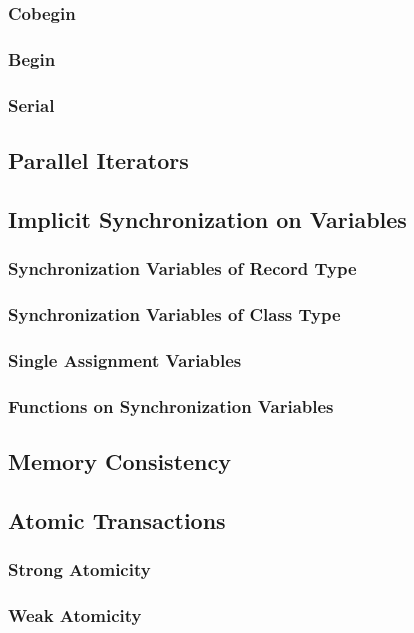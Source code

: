 \documentclass[10pt,twoside,titlepage]{article}
\begin{document}
\subsubsection{Cobegin}
\subsubsection{Begin}
\subsubsection{Serial}
\subsection{Parallel Iterators}
\subsection{Implicit Synchronization on Variables}
\subsubsection{Synchronization Variables of Record Type}
\subsubsection{Synchronization Variables of Class Type}
\subsubsection{Single Assignment Variables}
\subsubsection{Functions on Synchronization Variables}
\subsection{Memory Consistency}
\subsection{Atomic Transactions}
\subsubsection{Strong Atomicity}
\subsubsection{Weak Atomicity}
\end{document}
